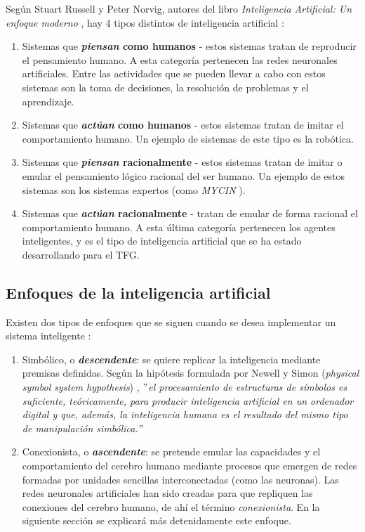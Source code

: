 Según Stuart Russell y Peter Norvig, autores del libro \textit{Inteligencia Artificial: Un enfoque moderno} \cite{russell2002artificial}, hay 4 tipos distintos de inteligencia artificial \cite{russell2002artificial, iaWikipedia}:
\begin{enumerate}
    \item Sistemas que \textbf{\textit{piensan} como humanos} - estos sistemas tratan de reproducir el pensamiento humano. A esta categoría pertenecen las redes neuronales artificiales. Entre las actividades que se pueden llevar a cabo con estos sistemas son la toma de decisiones, la resolución de problemas y el aprendizaje.
    \item Sistemas que \textbf{\textit{actúan} como humanos} - estos sistemas tratan de imitar el comportamiento humano. Un ejemplo de sistemas de este tipo es la robótica.
    \item Sistemas que \textbf{\textit{piensan} racionalmente} - estos sistemas tratan de imitar o emular el pensamiento lógico racional del ser humano. Un ejemplo de estos sistemas son los sistemas expertos (como \textit{MYCIN} \cite{shortliffe2012computer}).
    \item Sistemas que \textbf{\textit{actúan} racionalmente} - tratan de emular de forma racional el comportamiento humano. A esta última categoría pertenecen los agentes inteligentes, y es el tipo de inteligencia artificial que se ha estado desarrollando para el TFG.
\end{enumerate}

\subsection{Enfoques de la inteligencia artificial}

Existen dos tipos de enfoques que se siguen cuando se desea implementar un sistema inteligente \cite{copeland2020ai}:
\begin{enumerate}
    \item Simbólico, o \textit{\textbf{descendente}}: se quiere replicar la inteligencia mediante premisas definidas. Según la hipótesis formulada por Newell y Simon (\textit{physical symbol system hypothesis}) \cite{nilsson2007physical, newell2007computer}, \textit{$"$el procesamiento de estructuras de símbolos es suficiente, teóricamente, para producir inteligencia artificial en un ordenador digital y que, además, la inteligencia humana es el resultado del mismo tipo de manipulación simbólica.$"$}
    \item Conexionista, o \textit{\textbf{ascendente}}: se pretende emular las capacidades y el comportamiento del cerebro humano mediante procesos que emergen de redes formadas por unidades sencillas interconectadas (como las neuronas). Las redes neuronales artificiales han sido creadas para que repliquen las conexiones del cerebro humano, de ahí el término \textit{conexionista}. En la siguiente sección se explicará más detenidamente este enfoque. 
\end{enumerate}

